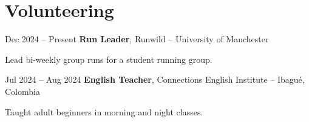 \documentclass[10pt, letterpaper]{article}
\begin{document}
    \section{Volunteering}

        \begin{twocolentry}{Dec 2024 -- Present}
            \textbf{Run Leader}, Runwild -- University of Manchester
        \end{twocolentry}
        \vspace{0.10 cm}
        \begin{onecolentry}
            \begin{highlights}
                \item Lead bi-weekly group runs for a student running group.
            \end{highlights}
        \end{onecolentry}

        \vspace{0.20 cm}

        \begin{twocolentry}{Jul 2024 -- Aug 2024}
            \textbf{English Teacher}, Connections English Institute -- Ibagué, Colombia
        \end{twocolentry}
        \vspace{0.10 cm}
        \begin{onecolentry}
            \begin{highlights}
                \item Taught adult beginners in morning and night classes.
            \end{highlights}
        \end{onecolentry}



            

                
\end{document}
